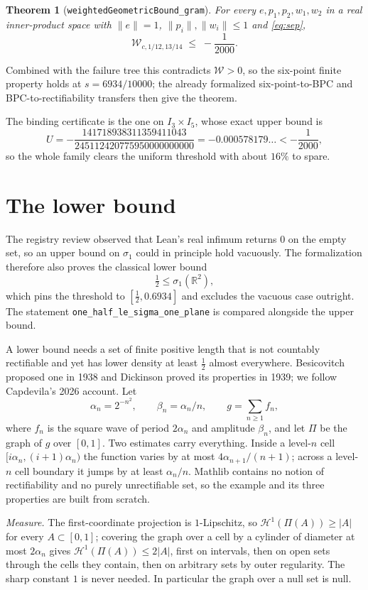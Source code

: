 \documentclass[11pt]{article}
\newtheorem{theorem}{Theorem}[section]
\newcommand{\score}{\mathcal{W}}
\newcommand{\R}{\mathbb{R}}
\newcommand{\norm}[1]{\lVert #1\rVert}
\begin{document}
\begin{theorem}[\texttt{weightedGeometricBound\_gram}]
For every $e,p_1,p_2,w_1,w_2$ in a real inner-product space with $\norm e=1$,
$\norm{p_i},\norm{w_i}\le1$ and \eqref{eq:sep},
\[
\score_{c,1/12,13/14}\;\le\;-\frac1{2000}.
\]
\end{theorem}

Combined with the failure tree this contradicts $\score>0$, so the six-point finite property holds
at $s=6934/10000$; the already formalized six-point-to-BPC and BPC-to-rectifiability transfers
then give the theorem.

The binding certificate is the one on $I_3\times I_5$, whose exact upper bound is
\[
U=-\frac{141718938311359411043}{245112420775950000000000}=-0.000578179\ldots<-\frac1{2000},
\]
so the whole family clears the uniform threshold with about $16\%$ to spare.

\section{The lower bound}
\label{sec:lower}

The registry review observed that Lean's real infimum returns $0$ on the empty set, so an upper
bound on $\sigma_1$ could in principle hold vacuously. The formalization therefore also proves
the classical lower bound
\[
\tfrac12\le\sigma_1(\R^2),
\]
which pins the threshold to $[\tfrac12,0.6934]$ and excludes the vacuous case outright. The
statement \texttt{one\_half\_le\_sigma\_one\_plane} is compared alongside the upper bound.

A lower bound needs a set of finite positive length that is not countably rectifiable and yet
has lower density at least $\tfrac12$ almost everywhere. Besicovitch proposed one in 1938 and
Dickinson proved its properties in 1939; we follow Capdevila's 2026 account. Let
\[
\alpha_n=2^{-n^2},\qquad \beta_n=\alpha_n/n,\qquad
g=\sum_{n\ge1}f_n,
\]
where $f_n$ is the square wave of period $2\alpha_n$ and amplitude $\beta_n$, and let $\Pi$ be
the graph of $g$ over $[0,1]$. Two estimates carry everything. Inside a level-$n$ cell
$[i\alpha_n,(i+1)\alpha_n)$ the function varies by at most $4\alpha_{n+1}/(n+1)$; across a
level-$n$ cell boundary it jumps by at least $\alpha_n/n$. Mathlib contains no notion of
rectifiability and no purely unrectifiable set, so the example and its three properties are
built from scratch.

\emph{Measure.} The first-coordinate projection is $1$-Lipschitz, so $\mathcal H^1(\Pi(A))\ge|A|$
for every $A\subset[0,1]$; covering the graph over a cell by a cylinder of diameter at most
$2\alpha_n$ gives $\mathcal H^1(\Pi(A))\le 2|A|$, first on intervals, then on open sets through
the cells they contain, then on arbitrary sets by outer regularity. The sharp constant $1$ is
never needed. In particular the graph over a null set is null.
\end{document}
